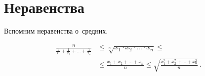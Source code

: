 
\section*{Неравенства}


Вспомним неравенства о~средних.

\begin{align*}
    \frac{n}{
	\frac{1}{x_1} + \frac{1}{x_2} + \ldots + \frac{1}{x_n}
    }
& \leq
    \sqrt[n]{x_1 \cdot x_2 \cdot \ldots \cdot x_n}
\leq \\ & \leq
    \frac{x_1 + x_2 + \ldots + x_n}{n}
\leq
    \sqrt{\frac{x_1^2 + x_2^2 + \ldots + x_n^2}{n}}
\, . \end{align*}

